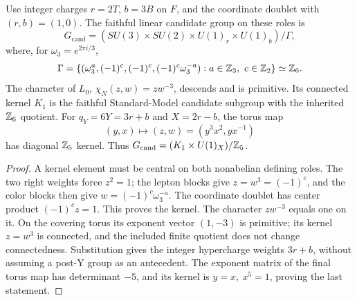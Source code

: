 \documentclass[11pt,a4paper]{article}
\begin{document}
\begin{proposition}
\label{p5:prop:pre-y-faithful-candidate-kernel}
Use integer charges \(r=2T\), \(b=3B\) on \(F\), and the
coordinate doublet with \((r,b)=(1,0)\).  The faithful linear
candidate group on these roles is
\[
 G_{\mathrm{cand}}=
 (SU(3)\times SU(2)\times U(1)_r\times U(1)_b)/\Gamma,
\]
where, for \(\omega_3=e^{2\pi i/3}\),
\[
 \Gamma=\{(\omega_3^a,(-1)^c,(-1)^c,
                 (-1)^c\omega_3^{-a}):a\in\mathbb{Z}_3,\ c\in\mathbb{Z}_2\}
 \simeq\mathbb{Z}_6.
\]
The character of \(L_0\),
\(\chi_N(z,w)=zw^{-3}\), descends and is primitive.
Its connected kernel \(K_1\) is the faithful Standard-Model
candidate subgroup with the inherited \(\mathbb{Z}_6\) quotient.
For \(q_Y=6Y=3r+b\) and \(X=2r-b\), the torus map
\[
 (y,x)\longmapsto(z,w)=(y^3x^2,yx^{-1})
\]
has diagonal \(\mathbb{Z}_5\) kernel.  Thus
\(G_{\mathrm{cand}}=(K_1\times U(1)_X)/\mathbb{Z}_5\).
\end{proposition}
\begin{proof}
A kernel element must be central on both nonabelian defining
roles.  The two right weights force \(z^2=1\); the lepton
blocks give \(z=w^3=(-1)^c\), and the color blocks then give
\(w=(-1)^c\omega_3^{-a}\).  The coordinate doublet has
center product \((-1)^cz=1\).  This proves the kernel.
The character \(zw^{-3}\) equals one on it.  On the covering
torus its exponent vector \((1,-3)\) is primitive; its kernel
\(z=w^3\) is connected, and the included finite quotient
does not change connectedness.  Substitution gives the
integer hypercharge weights \(3r+b\), without assuming a
post-Y group as an antecedent.  The exponent matrix of
the final torus map has determinant \(-5\), and its kernel
is \(y=x,\ x^5=1\), proving the last statement.
\end{proof}
\end{document}
